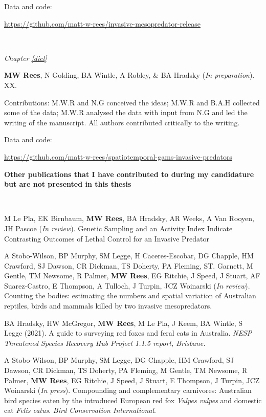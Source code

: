\documentclass[11pt,a4paper,titlepage,twoside,openright]{style/unimelbthesis}
\begin{document}
\begin{frontmatter}
\begin{preface}
    Data and code:
    
    \url{https://github.com/matt-w-rees/invasive-mesopredator-release}
    
    \(~\)
    
    \emph{Chapter \ref{diel}}
    
    \textbf{MW Rees}, N Golding, BA Wintle, A Robley, \& BA Hradsky (\emph{In preparation}). XX.
    
    Contributions: M.W.R and N.G conceived the ideas; M.W.R and B.A.H collected some of the data; M.W.R analysed the data with input from N.G and led the writing of the manuscript. All authors contributed critically to the writing.
    
    Data and code:
    
    \url{https://github.com/matt-w-rees/spatiotemporal-gams-invasive-predators}
    
    \newpage
    
    \textbf{Other publications that I have contributed to during my candidature but are not presented in this thesis}
    
    \(~\)
    
    M Le Pla, EK Birnbaum, \textbf{MW Rees}, BA Hradsky, AR Weeks, A Van Rooyen, JH Pascoe (\emph{In review}).
    Genetic Sampling and an Activity Index Indicate Contrasting Outcomes of Lethal Control for an Invasive Predator
    
    A Stobo-Wilson, BP Murphy, SM Legge, H Caceres-Escobar, DG Chapple, HM Crawford, SJ Dawson, CR Dickman, TS Doherty, PA Fleming, ST. Garnett, M Gentle, TM Newsome, R Palmer, \textbf{MW Rees}, EG Ritchie, J Speed, J Stuart, AF Suarez-Castro, E Thompson, A Tulloch, J Turpin, JCZ Woinarski (\emph{In review}). Counting the bodies: estimating the numbers and spatial variation of Australian reptiles, birds and mammals killed by two invasive mesopredators.
    
    BA Hradsky, HW McGregor, \textbf{MW Rees}, M Le Pla, J Keem, BA Wintle, S Legge (2021). A guide to surveying red foxes and feral cats in Australia. \emph{NESP Threatened Species Recovery Hub Project 1.1.5 report, Brisbane.}
    
    A Stobo-Wilson, BP Murphy, SM Legge, DG Chapple, HM Crawford, SJ Dawson, CR Dickman, TS Doherty, PA Fleming, M Gentle, TM Newsome, R Palmer, \textbf{MW Rees}, EG Ritchie, J Speed, J Stuart, E Thompson, J Turpin, JCZ Woinarski (\emph{In press}). Compounding and complementary carnivores: Australian bird species eaten by the introduced European red fox \emph{Vulpes vulpes} and domestic cat \emph{Felis catus}. \emph{Bird Conservation International}.
    

\end{preface}
\end{frontmatter}
\end{document}
